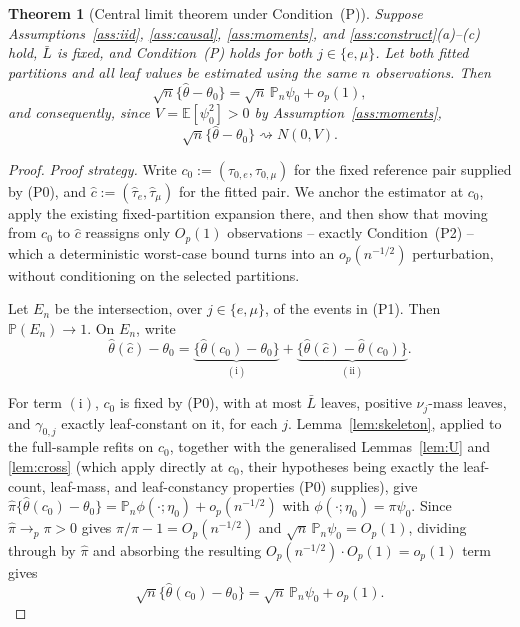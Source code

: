 \documentclass[11pt]{article}
\theoremstyle{plain}
\newtheorem{theorem}{Theorem}[section]
\theoremstyle{definition}
\theoremstyle{remark}
\newcommand{\E}{\mathbb{E}}
\newcommand{\PP}{\mathbb{P}}
\newcommand{\Pn}{\mathbb{P}_n}
\newcommand{\thetahat}{\widehat{\theta}}
\newcommand{\pihat}{\widehat{\pi}}
\begin{document}
\begin{theorem}[Central limit theorem under Condition~(P)]
\label{thm:main-P}
\label{lem:anchor-perturb}
Suppose Assumptions~\ref{ass:iid}, \ref{ass:causal},
\ref{ass:moments}, and \ref{ass:construct}(a)--(c) hold, $\bar L$ is fixed,
and Condition~(P) holds for both $j\in\{e,\mu\}$. Let both fitted partitions
and all leaf values be estimated using the same $n$ observations. Then
\[
  \sqrt n\{\thetahat-\theta_0\}
  =
  \sqrt n\,\Pn\psi_0+o_p(1),
\]
and consequently, since $V=\E[\psi_0^2]>0$ by Assumption~\ref{ass:moments},
\[
  \sqrt n\{\thetahat-\theta_0\}
  \rightsquigarrow N(0,V).
\]
\end{theorem}

\begin{proof}
\emph{Proof strategy.}
Write $c_0:=(\tau_{0,e},\tau_{0,\mu})$ for the fixed reference pair supplied
by (P0), and $\hat c:=(\hat\tau_e,\hat\tau_\mu)$ for the fitted pair. We
anchor the estimator at $c_0$, apply the existing fixed-partition expansion
there, and then show that moving from $c_0$ to $\hat c$ reassigns only
$O_p(1)$ observations -- exactly Condition~(P2) -- which a deterministic
worst-case bound turns into an $o_p(n^{-1/2})$ perturbation, without
conditioning on the selected partitions.

Let $E_n$ be the intersection, over $j\in\{e,\mu\}$, of the events in (P1).
Then $\PP(E_n)\to1$. On $E_n$, write
\begin{equation}\label{eq:anchor-decomp}
  \thetahat(\hat c)-\theta_0
  =
  \underbrace{\bigl\{\thetahat(c_0)-\theta_0\bigr\}}_{\mathrm{(i)}}
  +
  \underbrace{\bigl\{\thetahat(\hat c)-\thetahat(c_0)\bigr\}}_{\mathrm{(ii)}}.
\end{equation}

For term $\mathrm{(i)}$, $c_0$ is fixed by (P0), with at most $\bar L$ leaves,
positive $\nu_j$-mass leaves, and $\gamma_{0,j}$ exactly leaf-constant on it,
for each $j$. Lemma~\ref{lem:skeleton}, applied to the full-sample refits on
$c_0$, together with the generalised Lemmas~\ref{lem:U} and \ref{lem:cross}
(which apply directly at $c_0$, their hypotheses being exactly the leaf-count,
leaf-mass, and leaf-constancy properties (P0) supplies), give
$\pihat\{\thetahat(c_0)-\theta_0\}=\Pn\phi(\cdot;\eta_0)+o_p(n^{-1/2})$ with
$\phi(\cdot;\eta_0)=\pi\psi_0$. Since $\pihat\to_p\pi>0$ gives
$\pi/\pihat-1=O_p(n^{-1/2})$ and $\sqrt n\,\Pn\psi_0=O_p(1)$, dividing through
by $\pihat$ and absorbing the resulting $O_p(n^{-1/2})\cdot O_p(1)=o_p(1)$
term gives
\begin{equation}\label{eq:anchor-fixed-expansion}
  \sqrt n\bigl\{\thetahat(c_0)-\theta_0\bigr\}
  =
  \sqrt n\,\Pn\psi_0+o_p(1).
\end{equation}


\end{proof}
\end{document}
